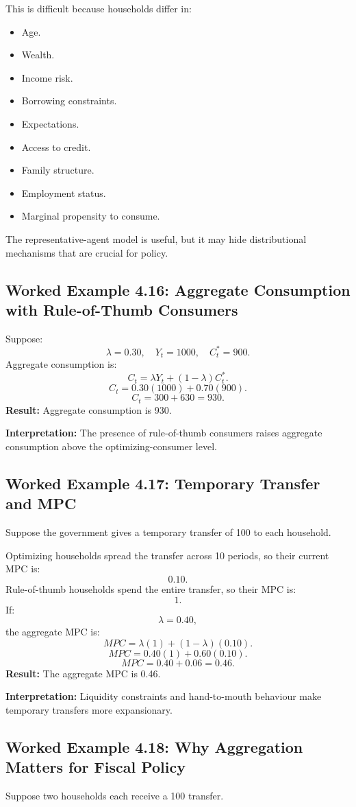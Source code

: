 \documentclass[12pt,a4paper]{article}
\begin{document}
This is difficult because households differ in:
\begin{itemize}
    \item Age.
    \item Wealth.
    \item Income risk.
    \item Borrowing constraints.
    \item Expectations.
    \item Access to credit.
    \item Family structure.
    \item Employment status.
    \item Marginal propensity to consume.
\end{itemize}
The representative-agent model is useful, but it may hide distributional mechanisms that are crucial for policy.

\subsection*{Worked Example 4.16: Aggregate Consumption with Rule-of-Thumb Consumers}
Suppose:
\[ \lambda = 0.30, \quad Y_t = 1000, \quad C_t^* = 900. \]
Aggregate consumption is:
\[ C_t = \lambda Y_t + (1 - \lambda) C_t^*. \]
\[ C_t = 0.30(1000) + 0.70(900). \]
\[ C_t = 300 + 630 = 930. \]
\textbf{Result:} Aggregate consumption is 930.

\textbf{Interpretation:} The presence of rule-of-thumb consumers raises aggregate consumption above the optimizing-consumer level.

\subsection*{Worked Example 4.17: Temporary Transfer and MPC}
Suppose the government gives a temporary transfer of 100 to each household.

Optimizing households spread the transfer across 10 periods, so their current MPC is:
\[ 0.10. \]
Rule-of-thumb households spend the entire transfer, so their MPC is:
\[ 1. \]
If:
\[ \lambda = 0.40, \]
the aggregate MPC is:
\[ MPC = \lambda(1) + (1 - \lambda)(0.10). \]
\[ MPC = 0.40(1) + 0.60(0.10). \]
\[ MPC = 0.40 + 0.06 = 0.46. \]
\textbf{Result:} The aggregate MPC is 0.46.

\textbf{Interpretation:} Liquidity constraints and hand-to-mouth behaviour make temporary transfers more expansionary.

\subsection*{Worked Example 4.18: Why Aggregation Matters for Fiscal Policy}
Suppose two households each receive a 100 transfer.
\end{document}
